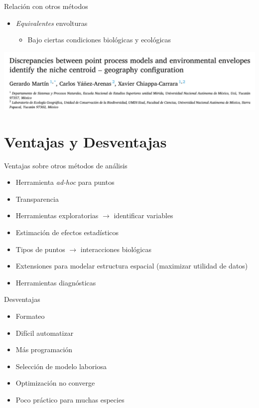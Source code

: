 \documentclass[
  11pt,
  ignorenonframetext,
]{beamer}
\providecommand{\tightlist}{%
  \setlength{\itemsep}{0pt}\setlength{\parskip}{0pt}}
\begin{document}
\begin{frame}{Relación con otros métodos}
\protect\hypertarget{relaciuxf3n-con-otros-muxe9todos}{}
\begin{itemize}
\item
  \emph{Equivalentes} envolturas

  \begin{itemize}
  \tightlist
  \item
    Bajo ciertas condiciones biológicas y ecológicas
  \end{itemize}
\end{itemize}

\includegraphics{Figuras/Discrep.png}
\end{frame}

\hypertarget{ventajas-y-desventajas}{%
\section{Ventajas y Desventajas}\label{ventajas-y-desventajas}}

\begin{frame}{Ventajas sobre otros métodos de análisis}
\protect\hypertarget{ventajas-sobre-otros-muxe9todos-de-anuxe1lisis}{}
\begin{itemize}
\tightlist
\item
  Herramienta \emph{ad-hoc} para puntos
\item
  Transparencia
\item
  Herramientas exploratorias \(\rightarrow\) identificar variables
\item
  Estimación de efectos estadísticos
\item
  Tipos de puntos \(\rightarrow\) interacciones biológicas
\item
  Extensiones para modelar estructura espacial (maximizar utilidad de
  datos)
\item
  Herramientas diagnósticas
\end{itemize}
\end{frame}

\begin{frame}{Desventajas}
\protect\hypertarget{desventajas}{}
\begin{itemize}
\tightlist
\item
  Formateo
\item
  Difícil automatizar
\item
  Más programación
\item
  Selección de modelo laboriosa
\item
  Optimización no converge
\item
  Poco práctico para muchas especies
\end{itemize}
\end{frame}
\end{document}
